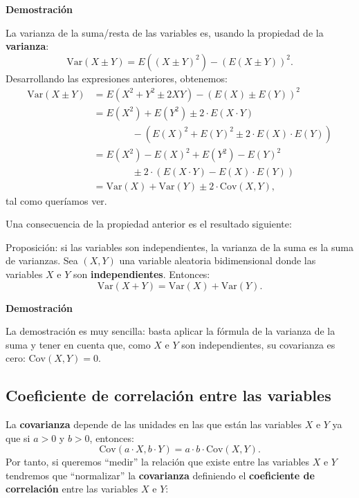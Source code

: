 \documentclass[]{book}
\begin{document}
\textbf{Demostración}

La varianza de la suma/resta de las variables es, usando la propiedad de la \textbf{varianza}:
\[
\mathrm{Var}(X\pm Y)=E\left((X\pm Y)^2\right)-\left(E(X\pm Y)\right)^2.
\]
Desarrollando las expresiones anteriores, obtenemos:
\[
\begin{array}{rl}
\mathrm{Var}(X\pm Y) & =E\left(X^2+Y^2\pm 2XY\right)-\left(E(X)\pm E(Y)\right)^2 \\ & =
E(X^2)+E(Y^2)\pm 2\cdot E(X\cdot Y) \\ &\qquad\qquad - \left(E(X)^2+E(Y)^2\pm 2\cdot E(X)\cdot E(Y)\right)
\\ & = E(X^2)-E(X)^2+E(Y^2)-E(Y)^2\\ &\qquad\qquad \pm 2\cdot (E(X\cdot Y)-E(X)\cdot E(Y)) \\ & = \mathrm{Var}(X)+\mathrm{Var}(Y)\pm 2\cdot \mathrm{Cov}(X,Y),
\end{array}
\]
tal como queríamos ver.

Una consecuencia de la propiedad anterior es el resultado siguiente:

Proposición: si las variables son independientes, la varianza de la suma es la suma de varianzas.
Sea \((X,Y)\) una variable aleatoria bidimensional donde las variables \(X\) e \(Y\) son \textbf{independientes}.
Entonces:
\[
\mathrm{Var}(X+Y)=\mathrm{Var}(X)+\mathrm{Var}(Y).
\]

\textbf{Demostración}

La demostración es muy sencilla: basta aplicar la fórmula de la varianza de la suma y tener en cuenta que, como \(X\) e \(Y\) son independientes, su covarianza es cero: \(\mathrm{Cov}(X,Y)=0\).

\hypertarget{coeficiente-de-correlaciuxf3n-entre-las-variables}{%
\subsection{Coeficiente de correlación entre las variables}\label{coeficiente-de-correlaciuxf3n-entre-las-variables}}

La \textbf{covarianza} depende de las unidades en las que están las variables \(X\) e \(Y\) ya que si \(a>0\) y \(b>0\), entonces:
\[
\mathrm{Cov}(a\cdot X,b\cdot Y)=a\cdot b\cdot \mathrm{Cov}(X,Y).
\]
Por tanto, si queremos ``medir'' la relación que existe entre las variables \(X\) e \(Y\) tendremos que ``normalizar'' la \textbf{covarianza} definiendo el \textbf{coeficiente de correlación} entre las variables \(X\) e \(Y\):
\end{document}
